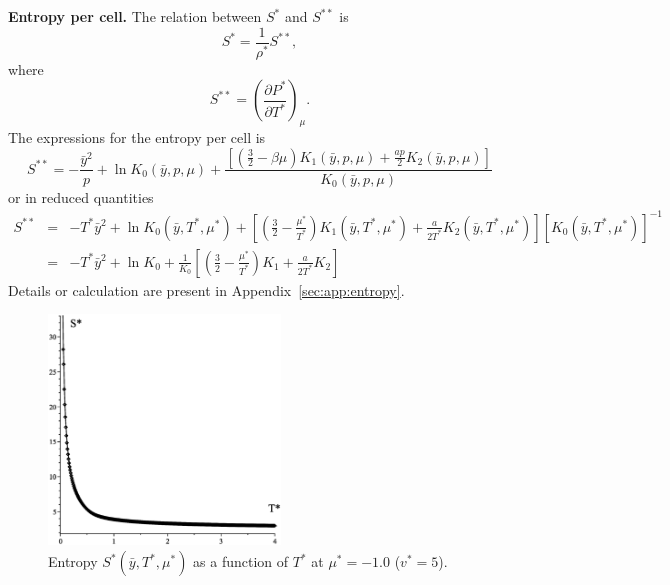 \documentclass[12pt]{article}
\numberwithin{equation}{section}
\begin{document}
	
	\textbf{Entropy per cell.} The relation between $S^*$ and $S^{**}$ is
	\begin{equation}
		S^* = \frac{1}{\rho^*} S^{**},
	\end{equation}
	where
	\begin{equation}
		\label{eq:entropy2}
		S^{**}  = \left(\frac{\partial P^*}{\partial T^*}\right)_{\mu}.
	\end{equation}
	The expressions for the entropy per cell is
	\begin{equation}
		S^{**} = -\frac{\bar{y}^2}{p} + \ln K_0(\bar{y},p,\mu) + \frac{\left[\left(\frac{3}{2} - \beta\mu\right)K_1(\bar{y},p,\mu) + \frac{ap}{2}K_2(\bar{y},p,\mu) \right]}{K_0(\bar{y},p,\mu)}
	\end{equation}
	or in reduced quantities
	\begin{eqnarray}
		S^{**} & = & -T^* \bar{y}^2 + \ln K_0(\bar{y},T^*,\mu^*) + \left[\left(\frac{3}{2} - \frac{\mu^*}{T^*}\right) K_1(\bar{y},T^*,\mu^*) + \frac{a}{2T^*} K_2(\bar{y},T^*,\mu^*) \right] [K_0(\bar{y},T^*,\mu^*)]^{-1}
		\nonumber \\
		& = & -T^* \bar{y}^2 + \ln K_0 + \frac{1}{K_0}\left[\left(\frac{3}{2} - \frac{\mu^*}{T^*}\right) K_1 + \frac{a}{2T^*} K_2 \right]
	\end{eqnarray}
	Details or calculation are present in Appendix~\ref{sec:app:entropy}.
	
	\begin{figure}[htbp]
		\includegraphics[width=0.55\textwidth,angle=0]{S_vs_T1}
		\centering
		\captionsetup{width=0.5\textwidth}
		{\caption{\label{fig:S_vs_T1} Entropy $S^{*}(\bar{y},T^*,\mu^*)$ as a function of $T^*$ at $\mu^*=-1.0$ ($v^* = 5$).}}
	\end{figure}
	
\end{document}

